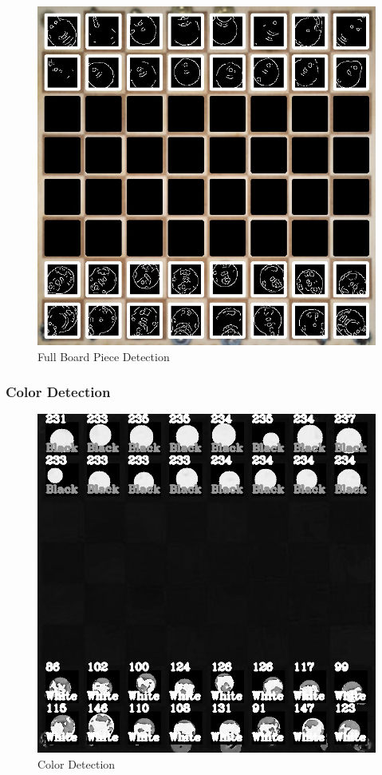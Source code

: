 \documentclass[journal]{IEEEtran}
\begin{document}
\begin{figure}[!ht]
	\centering
	\includegraphics[width=\linewidth]{Images/PieceDetection.jpg}
	\caption{Full Board Piece Detection}
	\label{piece detection}
\end{figure}

\vspace{12pt}

\subsubsection{Color Detection}

\begin{figure}[!ht]
	\centering
	\includegraphics[width=\linewidth]{Images/ColorDetection.jpg}
	\caption{Color Detection}
	\label{color}
\end{figure}
\end{document}
